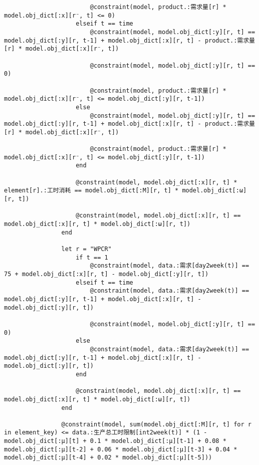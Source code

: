\begin{appendices}
\begin{lstlisting}
                        @constraint(model, product.:需求量[r] * model.obj_dict[:x][r⁻, t] <= 0)
                    elseif t == time
                        @constraint(model, model.obj_dict[:y][r, t] == model.obj_dict[:y][r, t-1] + model.obj_dict[:x][r, t] - product.:需求量[r] * model.obj_dict[:x][r⁻, t])

                        @constraint(model, model.obj_dict[:y][r, t] == 0)

                        @constraint(model, product.:需求量[r] * model.obj_dict[:x][r⁻, t] <= model.obj_dict[:y][r, t-1])
                    else
                        @constraint(model, model.obj_dict[:y][r, t] == model.obj_dict[:y][r, t-1] + model.obj_dict[:x][r, t] - product.:需求量[r] * model.obj_dict[:x][r⁻, t])

                        @constraint(model, product.:需求量[r] * model.obj_dict[:x][r⁻, t] <= model.obj_dict[:y][r, t-1])
                    end

                    @constraint(model, model.obj_dict[:x][r, t] * element[r].:工时消耗 == model.obj_dict[:M][r, t] * model.obj_dict[:ω][r, t])

                    @constraint(model, model.obj_dict[:x][r, t] == model.obj_dict[:x][r, t] * model.obj_dict[:ω][r, t])
                end

                let r = "WPCR"
                    if t == 1
                        @constraint(model, data.:需求[day2week(t)] == 75 + model.obj_dict[:x][r, t] - model.obj_dict[:y][r, t])
                    elseif t == time
                        @constraint(model, data.:需求[day2week(t)] == model.obj_dict[:y][r, t-1] + model.obj_dict[:x][r, t] - model.obj_dict[:y][r, t])

                        @constraint(model, model.obj_dict[:y][r, t] == 0)
                    else
                        @constraint(model, data.:需求[day2week(t)] == model.obj_dict[:y][r, t-1] + model.obj_dict[:x][r, t] - model.obj_dict[:y][r, t])
                    end

                    @constraint(model, model.obj_dict[:x][r, t] == model.obj_dict[:x][r, t] * model.obj_dict[:ω][r, t])
                end

                @constraint(model, sum(model.obj_dict[:M][r, t] for r in element_key) <= data.:生产总工时限制[int2week(t)] * (1 - model.obj_dict[:μ][t] + 0.1 * model.obj_dict[:μ][t-1] + 0.08 * model.obj_dict[:μ][t-2] + 0.06 * model.obj_dict[:μ][t-3] + 0.04 * model.obj_dict[:μ][t-4] + 0.02 * model.obj_dict[:μ][t-5]))


\end{lstlisting}
\end{appendices}
